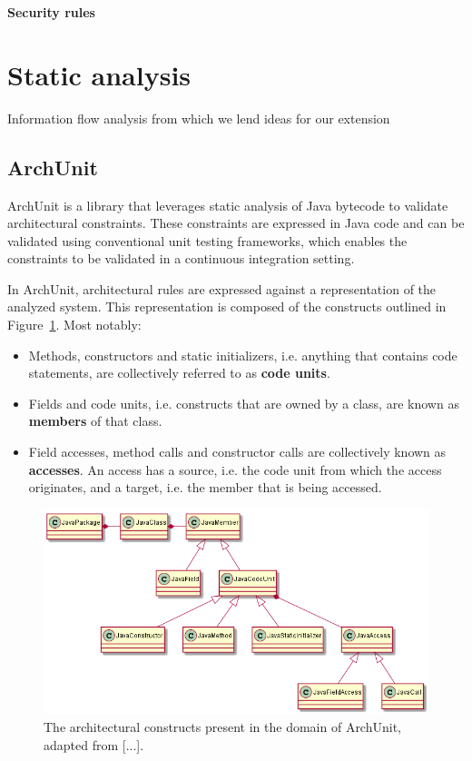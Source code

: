 \textbf{Security rules}

\section{Static analysis}
\cite{chess_secure_2007}

\cite{pistoia_survey_2007}

Information flow analysis \cite{hutchison_information_2005} from which we lend ideas for our extension


\subsection{ArchUnit}\label{archunit-back-section}
ArchUnit is a library that leverages static analysis of Java bytecode to validate architectural constraints. These constraints are expressed in Java code and can be validated using conventional unit testing frameworks, which enables the constraints to be validated in a continuous integration setting.

In ArchUnit, architectural rules are expressed against a representation of the analyzed system. This representation is composed of the constructs outlined in Figure~\ref{fig:archunit}. Most notably:

\begin{itemize}
    \item Methods, constructors and static initializers, i.e. anything that contains code statements, are collectively referred to as \textbf{code units}.
    \item Fields and code units, i.e. constructs that are owned by a class, are known as \textbf{members} of that class.
    \item Field accesses, method calls and constructor calls are collectively known as \textbf{accesses}. An access has a source, i.e. the code unit from which the access originates, and a target, i.e. the member that is being accessed.
\end{itemize}

\begin{figure}
    \centering
    \captionsetup{justification=centering}
    \includegraphics[width=\textwidth]{figure/ArchUnit.png}
    \caption{The architectural constructs present in the domain of ArchUnit, adapted from [...].}
    \label{fig:archunit}
\end{figure}

